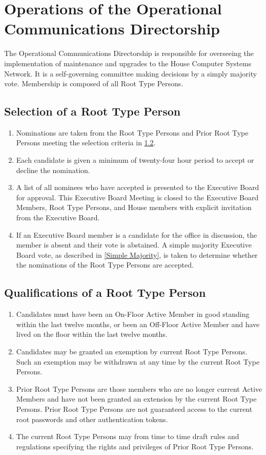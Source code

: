 \documentclass{article}
\newcommand{\bylaw}[1]{\section{#1} \label{#1}}
\newcommand{\bsection}[1]{\subsection{#1} \label{#1}}
\begin{document}
\bylaw{Operations of the Operational Communications Directorship}
The Operational Communications Directorship is responsible for overseeing the implementation of maintenance and upgrades to the House Computer Systems Network.
It is a self-governing committee making decisions by a simply majority vote.
Membership is composed of all Root Type Persons.

\bsection{Selection of a Root Type Person}
\renewcommand{\theenumi}{\alph{enumi}} %
\begin{enumerate}
	\item Nominations are taken from the Root Type Persons and Prior Root Type Persons meeting the selection criteria in \ref{Qualifications of a Root Type Person}.
	\item Each candidate is given a minimum of twenty-four hour period to accept or decline the nomination.
	\item A list of all nominees who have accepted is presented to the Executive Board for approval.
		This Executive Board Meeting is closed to the Executive Board Members, Root Type Persons, and House members with explicit invitation from the Executive Board.
	\item If an Executive Board member is a candidate for the office in discussion, the member is absent and their vote is abstained.
		A simple majority Executive Board vote, as described in \ref{Simple Majority}, is taken to determine whether the nominations of the Root Type Persons are accepted.
\end{enumerate}

\bsection{Qualifications of a Root Type Person}
\renewcommand{\theenumi}{\alph{enumi}} %
\begin{enumerate}
	\item Candidates must have been an On-Floor Active Member in good standing within the last twelve months, or been an Off-Floor Active Member and have lived on the floor within the last twelve months.
	\item Candidates may be granted an exemption by current Root Type Persons.
		Such an exemption may be withdrawn at any time by the current Root Type Persons.
	\item Prior Root Type Persons are those members who are no longer current Active Members and have not been granted an extension by the current Root Type Persons.
		Prior Root Type Persons are not guaranteed access to the current root passwords and other authentication tokens.
	\item The current Root Type Persons may from time to time draft rules and regulations specifying the rights and privileges of Prior Root Type Persons.
\end{enumerate}
\end{document}
